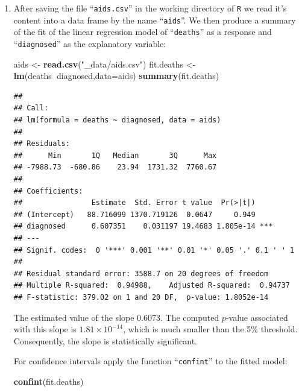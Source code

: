 \documentclass[]{krantz}
\makeatletter
\newenvironment{Shaded}{\begin{snugshade}}{\end{snugshade}}
\newcommand{\DataTypeTok}[1]{\textcolor[rgb]{0.13,0.29,0.53}{#1}}
\newcommand{\KeywordTok}[1]{\textcolor[rgb]{0.13,0.29,0.53}{\textbf{#1}}}
\newcommand{\NormalTok}[1]{#1}
\newcommand{\OperatorTok}[1]{\textcolor[rgb]{0.81,0.36,0.00}{\textbf{#1}}}
\newcommand{\StringTok}[1]{\textcolor[rgb]{0.31,0.60,0.02}{#1}}
\newenvironment{kframe}{%
\medskip{}
\setlength{\fboxsep}{.8em}
 \def\at@end@of@kframe{}%
 \ifinner\ifhmode%
  \def\at@end@of@kframe{\end{minipage}}%
  \begin{minipage}{\columnwidth}%
 \fi\fi%
 \def\FrameCommand##1{\hskip\@totalleftmargin \hskip-\fboxsep
 \colorbox{shadecolor}{##1}\hskip-\fboxsep
     \hskip-\linewidth \hskip-\@totalleftmargin \hskip\columnwidth}%
 \MakeFramed {\advance\hsize-\width
   \@totalleftmargin\z@ \linewidth\hsize
   \@setminipage}}%
 {\par\unskip\endMakeFramed%
 \at@end@of@kframe}
\renewenvironment{Shaded}{\begin{kframe}}{\end{kframe}}
\theoremstyle{definition}
\theoremstyle{definition}
\theoremstyle{definition}
\theoremstyle{remark}
\makeatother
\begin{document}
\begin{enumerate}
\def\labelenumi{\arabic{enumi}.}
\setcounter{enumi}{1}
\item
  After saving the file ``\texttt{aids.csv}''
  in the working directory of \texttt{R} we read it's content into a data frame
  by the name ``\texttt{aids}''. We then produce a summary of the fit of the linear
  regression model of ``\texttt{deaths}'' as a response and ``\texttt{diagnosed}'' as the
  explanatory variable:

\begin{Shaded}
\begin{Highlighting}[]
\NormalTok{aids <-}\StringTok{ }\KeywordTok{read.csv}\NormalTok{(}\StringTok{"_data/aids.csv"}\NormalTok{)}
\NormalTok{fit.deaths <-}\StringTok{ }\KeywordTok{lm}\NormalTok{(deaths}\OperatorTok{~}\NormalTok{diagnosed,}\DataTypeTok{data=}\NormalTok{aids)}
\KeywordTok{summary}\NormalTok{(fit.deaths)}
\end{Highlighting}
\end{Shaded}

\begin{verbatim}
## 
## Call:
## lm(formula = deaths ~ diagnosed, data = aids)
## 
## Residuals:
##      Min       1Q   Median       3Q      Max 
## -7988.73  -680.86    23.94  1731.32  7760.67 
## 
## Coefficients:
##                Estimate  Std. Error t value  Pr(>|t|)    
## (Intercept)   88.716099 1370.719126  0.0647     0.949    
## diagnosed      0.607351    0.031197 19.4683 1.805e-14 ***
## ---
## Signif. codes:  0 '***' 0.001 '**' 0.01 '*' 0.05 '.' 0.1 ' ' 1
## 
## Residual standard error: 3588.7 on 20 degrees of freedom
## Multiple R-squared:  0.94988,    Adjusted R-squared:  0.94737 
## F-statistic: 379.02 on 1 and 20 DF,  p-value: 1.8052e-14
\end{verbatim}

  The estimated value of the slope 0.6073. The computed \(p\)-value
  associated with this slope is \(1.81 \times 10^{-14}\), which is much
  smaller than the 5\% threshold. Consequently, the slope is statistically
  significant.

  For confidence intervals apply the function ``\texttt{confint}'' to the fitted
  model:

\begin{Shaded}
\begin{Highlighting}[]
\KeywordTok{confint}\NormalTok{(fit.deaths)}
\end{Highlighting}
\end{Shaded}


\end{enumerate}
\end{document}
